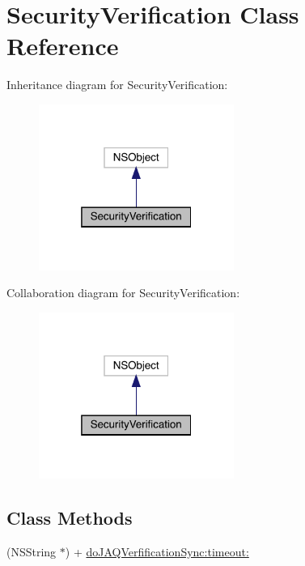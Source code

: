 \hypertarget{interface_security_verification}{}\section{Security\+Verification Class Reference}
\label{interface_security_verification}


Inheritance diagram for Security\+Verification\+:\nopagebreak
\begin{figure}[H]
\begin{center}
\leavevmode
\includegraphics[width=181pt]{interface_security_verification__inherit__graph}
\end{center}
\end{figure}


Collaboration diagram for Security\+Verification\+:\nopagebreak
\begin{figure}[H]
\begin{center}
\leavevmode
\includegraphics[width=181pt]{interface_security_verification__coll__graph}
\end{center}
\end{figure}
\subsection*{Class Methods}
\begin{DoxyCompactItemize}
\item 
(N\+S\+String $\ast$) + \mbox{\hyperlink{interface_security_verification_ad3ffbcd5e2921b79663ef2fa6fddf524}{do\+J\+A\+Q\+Verfification\+Sync\+:timeout\+:}}
\end{DoxyCompactItemize}


